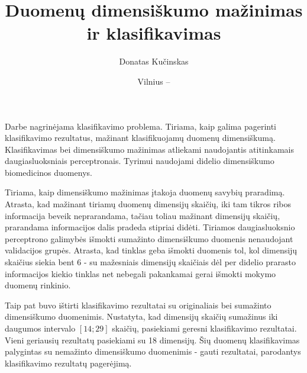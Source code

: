 \documentclass{VUMIFPSbakalaurinis}
\title{Duomenų dimensiškumo mažinimas ir klasifikavimas}
\author{Donatas Kučinskas}
\date{Vilnius – \the\year}
\begin{document}
\maketitle

\setcounter{page}{2}




Darbe nagrinėjama klasifikavimo problema.
Tiriama, kaip galima pagerinti klasifikavimo rezultatus, mažinant klasifikuojamų duomenų dimensiškumą.
Klasifikavimas bei dimensiškumo mažinimas atliekami naudojantis atitinkamais daugiasluoksniais perceptronais.
Tyrimui naudojami didelio dimensiškumo biomedicinos duomenys.

Tiriama, kaip dimensiškumo mažinimas įtakoja duomenų savybių praradimą.
Atrasta, kad mažinant tiriamų duomenų dimensijų skaičių, iki tam tikros ribos informacija beveik neprarandama, tačiau toliau mažinant dimensijų skaičių, prarandama informacijos dalis pradeda stipriai didėti.
Tiriamos daugiasluoksnio perceptrono galimybės išmokti sumažinto dimensiškumo duomenis nenaudojant validacijos grupės.
Atrasta, kad tinklas geba išmokti duomenis tol, kol dimensijų skaičius siekia bent 6 - su mažesniais dimensijų skaičiais dėl per didelio prarasto informacijos kiekio tinklas net nebegali pakankamai gerai išmokti mokymo duomenų rinkinio.

Taip pat buvo ištirti klasifikavimo rezultatai su originaliais bei sumažinto dimensiškumo duomenimis.
Nustatyta, kad dimensijų skaičių sumažinus iki daugumos intervalo $[14; 29]$ skaičių, pasiekiami geresni klasifikavimo rezultatai.
Vieni geriausių rezultatų pasiekiami su 18 dimensijų.
Šių duomenų klasifikavimas palygintas su nemažinto dimensiškumo duomenimis - gauti rezultatai, parodantys klasifikavimo rezultatų pagerėjimą.




\end{document}
